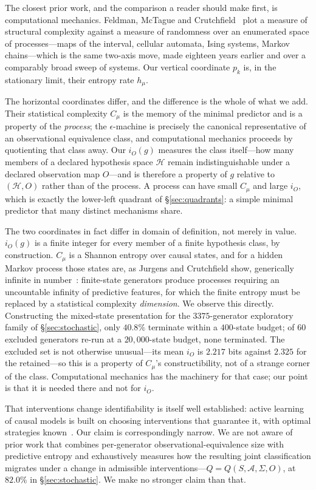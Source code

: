 \documentclass[11pt]{article}
\newcommand{\HH}{\ensuremath{\mathcal{H}}}
\begin{document}
The closest prior work, and the comparison a reader should make first, is computational
mechanics. Feldman, McTague and Crutchfield~\cite{feldman2008} plot a measure of
structural complexity against a measure of randomness over an enumerated space of
processes---maps of the interval, cellular automata, Ising systems, Markov chains---which
is the same two-axis move, made eighteen years earlier and over a comparably broad
sweep of systems. Our vertical coordinate $p_k$ is, in the stationary limit, their
entropy rate $h_\mu$.

The horizontal coordinates differ, and the difference is the whole of what we add. Their
statistical complexity $C_\mu$ is the memory of the minimal predictor and is a property of
the \emph{process}; the $\epsilon$-machine is precisely the canonical representative of an
observational equivalence class, and computational mechanics proceeds by quotienting that
class away. Our $i_O(g)$ measures the class itself---how many members of a declared
hypothesis space $\HH$ remain indistinguishable under a declared observation map $O$---and
is therefore a property of $g$ relative to $(\HH, O)$ rather than of the process. A process
can have small $C_\mu$ and large $i_O$, which is exactly the lower-left quadrant of
\S\ref{sec:quadrants}: a simple minimal predictor that many distinct mechanisms share.

The two coordinates in fact differ in domain of definition, not merely in value. $i_O(g)$
is a finite integer for every member of a finite hypothesis class, by construction.
$C_\mu$ is a Shannon entropy over causal states, and for a hidden Markov process those
states are, as Jurgens and Crutchfield show, generically infinite in
number~\cite{jurgens2021}: finite-state generators produce processes requiring an
uncountable infinity of predictive features, for which the finite entropy must be replaced
by a statistical complexity \emph{dimension}. We observe this directly. Constructing the
mixed-state presentation for the $3375$-generator exploratory family of
\S\ref{sec:stochastic}, only $40.8\%$ terminate within a $400$-state budget; of $60$
excluded generators re-run at a $20{,}000$-state budget, none terminated. The excluded set
is not otherwise unusual---its mean $i_O$ is $2.217$ bits against $2.325$ for the
retained---so this is a property of $C_\mu$'s constructibility, not of a strange corner of
the class. Computational mechanics has the machinery for that case; our point is that it
is needed there and not for $i_O$.

That interventions change identifiability is itself well established: active learning of
causal models is built on choosing interventions that guarantee it, with optimal strategies
known~\cite{hauser2014}. Our claim is correspondingly narrow. We are not aware of prior
work that combines per-generator observational-equivalence size with predictive entropy and
exhaustively measures how the resulting joint classification migrates under a change in
admissible interventions---$Q = Q(S, \mathcal{A}, \Sigma, O)$, at $82.0\%$ in
\S\ref{sec:stochastic}. We make no stronger claim than that.
\end{document}
